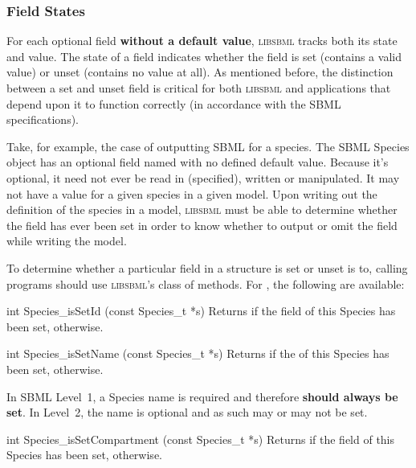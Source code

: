 \documentclass{sbmlmanual}
\newcommand{\libsbml}{\textsc{libsbml}}
\begin{document}
\subsubsection{Field States}
\label{sec:field-states}

For each optional field \textbf{without a default value}, \libsbml{} tracks
both its state and value.  The state of a field indicates whether the field
is set (contains a valid value) or unset (contains no value at all).  As
mentioned before, the distinction between a set and unset field is critical
for both \libsbml{} and applications that depend upon it to function
correctly (in accordance with the SBML specifications).

Take, for example, the case of outputting SBML for a species.  The SBML
Species object has an optional field named  with no defined
default value.  Because it's optional, it need not ever be read in
(specified), written or manipulated.  It may not have a value for a given
species in a given model.  Upon writing out the definition of the species
in a model, \libsbml{} must be able to determine whether the field has ever
been set in order to know whether to output or omit the field while writing
the model.

To determine whether a particular field in a structure is set or unset is
to, calling programs should use \libsbml{}'s  class
of methods.  For , the following are available:


\begin{methoddef}{int Species\_isSetId (const Species\_t *s)}
  Returns  if the  field of this Species has been set,
   otherwise.
\end{methoddef}


\begin{methoddef}{int Species\_isSetName (const Species\_t *s)}
  Returns  if the  of this Species has been set,
   otherwise.
 
  In SBML Level~1, a Species name is required and therefore \textbf{should
    always be set}.  In Level~2, the name is optional and as such may or
  may not be set.
\end{methoddef}


\begin{methoddef}{int Species\_isSetCompartment (const Species\_t *s)}
  Returns  if the  field of this Species has
  been set,  otherwise.
\end{methoddef}
\end{document}
